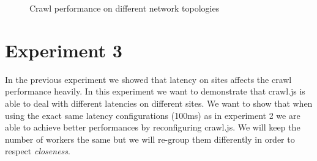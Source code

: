 \begin{figure}
  \centering
  \caption{Crawl performance on different network topologies}
  \label{plot:exp_002}
\end{figure}

\section{Experiment 3}

In the previous experiment we showed that latency on sites affects the crawl performance heavily. In this experiment we want to demonstrate that crawl.js is able to deal with different latencies on different sites. We want to show that when using the exact same latency configurations (100ms) as in experiment 2 we are able to achieve better performances by reconfiguring crawl.js. We will keep the number of workers the same but we will re-group them differently in order to respect \emph{closeness}.

